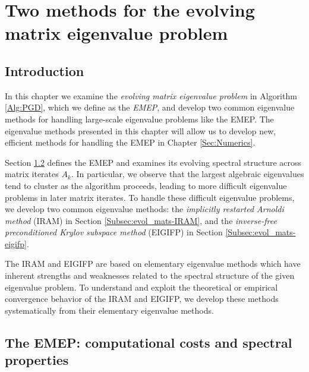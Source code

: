 \chapter{Two methods for the evolving matrix eigenvalue problem}		\label{Sec:evol_mats}



\section{Introduction}   \label{Subsec:evol_mats-intro}


In this chapter we examine the \textit{evolving matrix eigenvalue problem} in Algorithm \ref{Alg:PGD}, which we define as the \textit{EMEP}, and develop two common eigenvalue methods for handling large-scale eigenvalue problems like the EMEP.  The eigenvalue methods presented in this chapter will allow us to develop new, efficient methods for handling the EMEP in Chapter \ref{Sec:Numerics}.

Section \ref{Subsec:evol_mats-spectral_props} defines the EMEP and examines its evolving spectral structure across matrix iterates $A_k$.  
In particular, we observe that the largest algebraic eigenvalues tend to cluster as the algorithm proceeds, leading to more difficult eigenvalue problems in later matrix iterates.  
To handle these difficult eigenvalue problems, we develop two common eigenvalue methods: the \textit{implicitly restarted Arnoldi method} (IRAM) \cite{sorensen1992implicit} in Section \ref{Subsec:evol_mats-IRAM},
and the \textit{inverse-free preconditioned Krylov subspace method} (EIGIFP) \cite{golub2002inverse} in Section \ref{Subsec:evol_mats-eigifp}.


The IRAM and EIGIFP are based on elementary eigenvalue methods which have inherent strengths and weaknesses related to the spectral structure of the given eigenvalue problem.  
To understand and exploit the theoretical or empirical convergence behavior of the IRAM and EIGIFP, we develop these methods systematically from their elementary eigenvalue methods.









\section{The EMEP: computational costs and spectral properties}		\label{Subsec:evol_mats-spectral_props}

